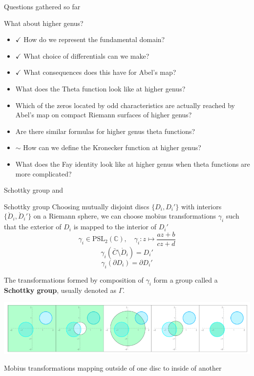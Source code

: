 \documentclass[11pt,aspectratio=169]{beamer}
\begin{document}
\begin{frame}{Questions gathered so far}
    {
        \begin{block}{What about higher genus?}
            \begin{itemize}
                \item $\checkmark$ How do we represent the fundamental domain? 
                \item $\checkmark$ What choice of differentials can we make?
                \item $\checkmark$ What consequences does this have for Abel's map?
                \item What does the Theta function look like at higher genus?
                \item Which of the zeros located by odd characteristics are actually reached by Abel's map on compact Riemann surfaces of higher genus?
                \item Are there similar formulas for higher genus theta functions?
                \item $\sim$ How can we define the Kronecker function at higher genus?
                \item What does the Fay identity look like at higher genus when theta functions are more complicated?
            \end{itemize}
        \end{block}
    }
\end{frame}

\begin{frame}{Schottky group}{\tiny \cite{ComputationalSchottky} and \cite{Cha22}}
    \begin{block}{Schottky group}
        Choosing mutually disjoint discs $\{D_i,D_i'\}$ with interiors $\{\mathring{D}_i,\mathring{D}_i'\}$ on a Riemann sphere,
        we can choose mobius transformations $\gamma_i$ such that the exterior of $D_i$ is mapped to the interior of $D_i'$
        \[\gamma_i \in \text{PSL}_2(\mathbb C) , \quad \gamma_i : z \mapsto \frac{az+b}{cz+d}\]
        \[\gamma_i(\bar C \setminus \mathring{D}_i) = D_i'\]
        \[\gamma_i(\partial D_i) = \partial D_i'\]

        The transformations formed by composition of $\gamma_i$ form a group called a \textbf{Schottky group}, usually denoted as $\Gamma$.
    \end{block}

    \center{}
    \includegraphics[width=0.7\columnwidth]{assets/ChanSchottkyGroup.png}

    \tiny Mobius transformations mapping outside of one disc to inside of another

    \cite{Cha22}
\end{frame}
\end{document}

